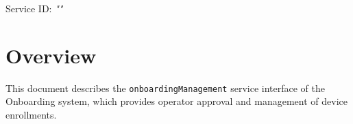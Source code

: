 \documentclass[a4paper]{arrowhead}
\begin{document}
\sloppy

\ArrowheadSetup

\begin{center}
  \vspace*{1cm}
  \huge{\arrowtitle}

  \vspace*{0.2cm}
  \LARGE{\arrowtype}
  \vspace*{1cm}

  \Large{Service ID: \textit{"\arrowid"}}

  \vspace*{\fill}


  \vspace*{1cm}
  \vspace*{\fill}

  \begin{abstract}
    This document describes the HTTP/1.1 protocol with TLS payload security and JSON payload encoding variant of the \texttt{onboarding\allowbreak{}Management} service of the Onboarding system.
  \end{abstract}

  \vspace*{1cm}
\end{center}

\newpage

\tableofcontents
\newpage

\section{Overview}
\label{sec:overview}

This document describes the \texttt{onboarding\allowbreak{}Management} service interface of the Onboarding system, which provides operator approval and management of device enrollments.
\end{document}
